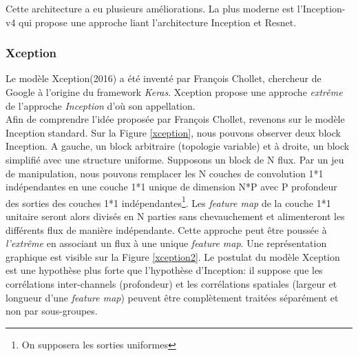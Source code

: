 \noindent Cette architecture a eu plusieurs améliorations. La plus moderne est l'Inception-v4\cite{inceptionv4} qui propose une approche liant l'architecture Inception et Resnet.

\subsubsection{Xception}
Le modèle Xception\cite{xception}(2016) a été inventé par François Chollet, chercheur de Google à l'origine du framework \textit{Keras}. Xception propose une approche \textit{extrême} de l'approche \textit{Inception} d'où son appellation.\\

\noindent Afin de comprendre l'idée proposée par François Chollet, revenons sur le modèle Inception standard. Sur la Figure \ref{xception}, nous pouvons observer deux block Inception. A gauche, un block arbitraire (topologie variable) et à droite, un block simplifié avec une structure uniforme. Supposons un block de N flux. Par un jeu de manipulation, nous pouvons remplacer les N couches de convolution 1*1 indépendantes en une couche 1*1 unique de dimension N*P avec P profondeur des sorties des couches 1*1 indépendantes\footnote{On supposera les sorties uniformes}. Les \textit{feature map} de la couche 1*1 unitaire seront alors divisés en N parties sans chevauchement et alimenteront les différents flux de manière indépendante. Cette approche peut être poussée à \textit{l'extrême} en associant un flux à une unique \textit{feature map}. Une représentation graphique est visible sur la Figure \ref{xception2}. Le postulat du modèle Xception est une hypothèse plus forte que l'hypothèse d'Inception: il suppose que les corrélations inter-channels (profondeur) et les corrélations spatiales (largeur et longueur d'une \textit{feature map}) peuvent être complètement traitées séparément et non par sous-groupes.\\

